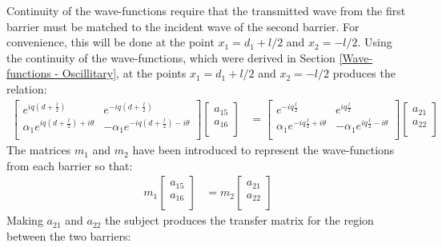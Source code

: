 				Continuity of the wave-functions require that the transmitted wave from the first barrier must be matched to the incident wave of the second barrier. For convenience, this will be done at the point $x_{1}=d_{1}+l/2$ and $x_{2}=-l/2$. Using the continuity of the wave-functions, which were derived in Section \ref{Wave-functions - Oscillitary}, at the points $x_{1}=d_{1}+l/2$ and $x_{2}=-l/2$ produces the relation:
				\begin{align}
					\left[\begin{array}{cc}
						e^{iq\left(d+\frac{l}{2}\right)}&e^{-iq\left(d+\frac{l}{2}\right)}\\
						\alpha_{1}e^{iq\left(d+\frac{l}{2}\right)+i\theta}&-\alpha_{1}e^{-iq\left(d+\frac{l}{2}\right)-i\theta}\\
					\end{array}\right]
					\left[\begin{array}{cc}
						a_{15}\\
						a_{16}\\
					\end{array}\right]
					&=
					\left[\begin{array}{cc}
						e^{-iq\frac{l}{2}}&e^{iq\frac{l}{2}}\\
						\alpha_{1}e^{-iq\frac{l}{2}+i\theta}&-\alpha_{1}e^{iq\frac{l}{2}-i\theta}\\
					\end{array}\right]
					\left[\begin{array}{cc}
						a_{21}\\
						a_{22}\\
					\end{array}\right]
				\end{align}
				The matrices $m_{1}$ and $m_{2}$ have been introduced to represent the wave-functions from each barrier so that:
				\begin{align}
					m_{1}
					\left[\begin{array}{cc}
						a_{15}\\
						a_{16}\\
					\end{array}\right]
					&=m_{2}
					\left[\begin{array}{cc}
						a_{21}\\
						a_{22}\\
					\end{array}\right]
				\end{align}
				Making $a_{21}$ and $a_{22}$ the subject produces the transfer matrix for the region between the two barriers:
